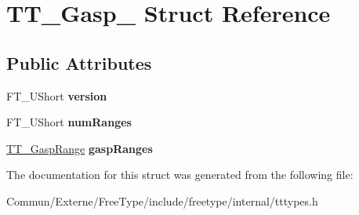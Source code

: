 \hypertarget{struct_t_t___gasp__}{}\section{T\+T\+\_\+\+Gasp\+\_\+ Struct Reference}
\label{struct_t_t___gasp__}
\subsection*{Public Attributes}
\begin{DoxyCompactItemize}
\item 
F\+T\+\_\+\+U\+Short {\bfseries version}\hypertarget{struct_t_t___gasp___a0166777999a11a32068418ed6cf0caf8}{}\label{struct_t_t___gasp___a0166777999a11a32068418ed6cf0caf8}

\item 
F\+T\+\_\+\+U\+Short {\bfseries num\+Ranges}\hypertarget{struct_t_t___gasp___a03f6dc693ebee0fedc055ac0981ee776}{}\label{struct_t_t___gasp___a03f6dc693ebee0fedc055ac0981ee776}

\item 
\hyperlink{struct_t_t___gasp_range_rec__}{T\+T\+\_\+\+Gasp\+Range} {\bfseries gasp\+Ranges}\hypertarget{struct_t_t___gasp___a50240e84cfd7fc79ae1f2996ecb2a5d1}{}\label{struct_t_t___gasp___a50240e84cfd7fc79ae1f2996ecb2a5d1}

\end{DoxyCompactItemize}


The documentation for this struct was generated from the following file\+:\begin{DoxyCompactItemize}
\item 
Commun/\+Externe/\+Free\+Type/include/freetype/internal/tttypes.\+h\end{DoxyCompactItemize}
